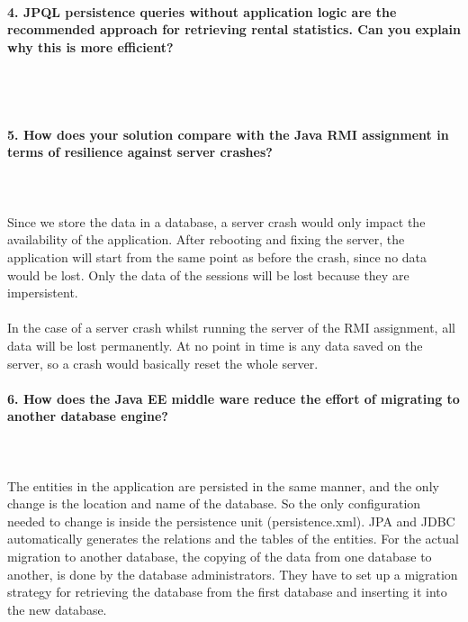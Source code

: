 \documentclass{ds-report}
\begin{document}
	\paragraph{4. JPQL persistence queries without application logic are the recommended approach for retrieving rental statistics. Can you explain why this is more efficient?} \mbox{}\\\\





	\paragraph{5. How does your solution compare with the Java RMI assignment in terms of resilience against server crashes?} \mbox{}\\\\
Since we store the data in a database, a server crash would only impact the availability of the application. After rebooting and fixing the server, the application will start from the same point as before the crash, since no data would be lost. Only the data of the sessions will be lost because they are impersistent. \mbox{}\\\\
In the case of a server crash whilst running the server of the RMI assignment, all data will be lost permanently. At no point in time is any data saved on the server, so a crash would basically reset the whole server.



		\paragraph{6. How does the Java EE middle ware reduce the effort of migrating to another database engine?} \mbox{}\\\\
The entities in the application are persisted in the same manner, and the only change is the location and name of the database. So the only configuration needed to change is inside the persistence unit (persistence.xml). JPA and JDBC automatically generates the relations and the tables of the entities.  
For the actual migration to another database, the copying of the data from one database to another, is done by the database administrators. They have to set up a migration strategy for retrieving the database from the first database and inserting it into the new database. 
\end{document}
